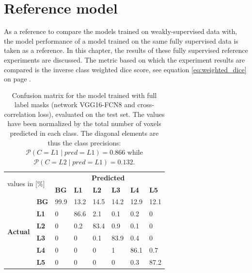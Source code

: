 \chapter{Reference model\label{sec:reference_model}}\thispagestyle{empty}
\par{
    As a reference to compare the models trained on weakly-supervised data with, the model performance of a model trained on the same fully supervised data is taken as a reference.
    In this chapter, the results of these fully supervised reference experiments are discussed.
    The metric based on which the experiment results are compared is the inverse class weighted dice score, see equation \ref{eq:weighted_dice} on page \pageref{eq:weighted_dice}.
}
\begin{table}
 

\begin{tabular}{cl|llllll}
    \toprule
    \multicolumn{2}{l|}{\multirow{2}{*}{values in {[}\%{]}}} & \multicolumn{6}{c}{\textbf{Predicted}}                                            \\
    \multicolumn{2}{l|}{}                                    & \textbf{BG} & \textbf{L1} & \textbf{L2} & \textbf{L3} & \textbf{L4} & \textbf{L5} \\ \hline
    \multirow{6}{*}{\textbf{Actual}}      & \textbf{BG}      & 99.9        & 13.2        & 14.5        & 14.2        & 12.9        & 12.1        \\
     & \textbf{L1} & 0 & 86.6 & 2.1  & 0.1  & 0.2  & 0    \\
     & \textbf{L2} & 0 & 0.2  & 83.4 & 0.9  & 0.1  & 0    \\
     & \textbf{L3} & 0 & 0    & 0.1  & 83.9 & 0.4  & 0    \\
     & \textbf{L4} & 0 & 0    & 0    & 1    & 86.1 & 0.7  \\
     & \textbf{L5} & 0 & 0    & 0    & 0    & 0.3  & 87.2 \\ \bottomrule
    \end{tabular}

    \caption{Confusion matrix for the model trained with full label masks (network VGG16-FCN8 and cross-correlation loss), evaluated on the test set.
    The values have been normalized by the total number of voxels predicted in each class.
    The diagonal elements are thus the class precisions: $\mathcal{P}(C = L1 \mid pred = L1) = 0.866$ while $\mathcal{P}(C = L2 \mid pred = L1) = 0.132$.
    \label{tab:full_confusionMatrix}
    }
\end{table}

